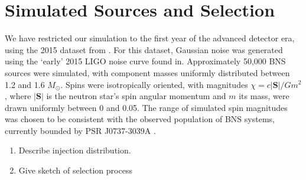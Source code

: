 \section{Simulated Sources and Selection}

We have restricted our simulation to the first year of the advanced detector era, using the 2015 dataset from \cite{Singer_2014}.  For this dataset, Gaussian noise was generated using the `early' 2015 LIGO noise curve found in\cite{Barsotti:2012}.  Approximately 50,000 BNS sources were simulated, with component masses uniformly distributed between 1.2 and 1.6 $M_\odot$.  Spins were isotropically oriented, with magnitudes $\chi = c |\mathbf{S}|/G m^2$, where $|\mathbf{S}|$ is the neutron star's spin angular momentum and $m$ its mass, were drawn uniformly between 0 and 0.05.  The range of simulated spin magnitudes was chosen to be consistent with the observed population of BNS systems, currently bounded by PSR J0737-3039A \cite{Burgay_2003,Brown_2012}.


\begin{enumerate}
\item Describe injection distribution.
\item Give sketch of selection process
\end{enumerate}